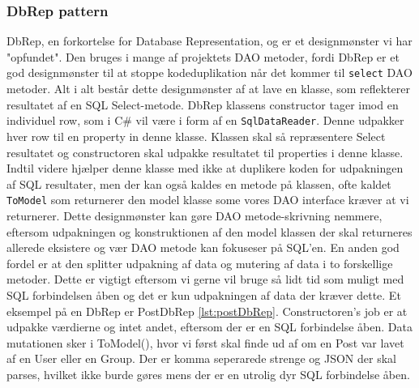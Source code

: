 \subsubsection{DbRep pattern}\label{sec:dbRep}
DbRep, en forkortelse for Database Representation, og er et designmønster vi har "opfundet". Den bruges i mange af projektets DAO metoder, fordi DbRep er et god designmønster til at stoppe kodeduplikation når det kommer til \texttt{select} DAO metoder.
Alt i alt består dette designmønster af at lave en klasse, som reflekterer resultatet af en SQL Select-metode. DbRep klassens constructor tager imod en individuel row, som i C\# vil være i form af en \texttt{SqlDataReader}. Denne udpakker hver row til en property in denne klasse. Klassen skal så repræsentere Select resultatet og constructoren skal udpakke resultatet til properties i denne klasse.
Indtil videre hjælper denne klasse med ikke at duplikere koden for udpakningen af SQL resultater, men der kan også kaldes en metode på klassen, ofte kaldet \texttt{ToModel} som returnerer den model klasse some vores DAO interface kræver at vi returnerer.
Dette designmønster kan gøre DAO metode-skrivning nemmere, eftersom udpakningen og konstruktionen af den model klassen der skal returneres allerede eksistere og vær DAO metode kan fokuseser på SQL'en.
En anden god fordel er at den splitter udpakning af data og mutering af data i to forskellige metoder. Dette er vigtigt eftersom vi gerne vil bruge så lidt tid som muligt med SQL forbindelsen åben og det er kun udpakningen af data der kræver dette.
Et eksempel på en DbRep er PostDbRep \ref{lst:postDbRep}. Constructoren's job er at udpakke værdierne og intet andet, eftersom der er en SQL forbindelse åben. Data mutationen sker i ToModel(), hvor vi først skal finde ud af om en Post var lavet af en User eller en Group. Der er komma seperarede strenge og JSON der skal parses, hvilket ikke burde gøres mens der er en utrolig dyr SQL forbindelse åben.

